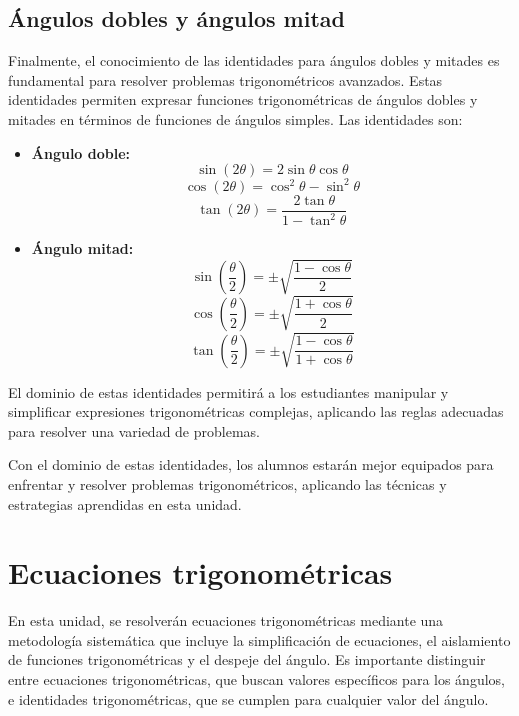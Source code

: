 \subsection{Ángulos dobles y ángulos mitad}

Finalmente, el conocimiento de las identidades para ángulos dobles y mitades es fundamental para resolver problemas trigonométricos avanzados. Estas identidades permiten expresar funciones trigonométricas de ángulos dobles y mitades en términos de funciones de ángulos simples. Las identidades son:

\begin{itemize}
    \item \textbf{Ángulo doble:}
    \[
    \sin (2\theta) = 2 \sin \theta \cos \theta
    \]
    \[
    \cos (2\theta) = \cos^2 \theta - \sin^2 \theta
    \]
    \[
    \tan (2\theta) = \frac{2 \tan \theta}{1 - \tan^2 \theta}
    \]

    \item \textbf{Ángulo mitad:}
    \[
    \sin \left(\frac{\theta}{2}\right) = \pm \sqrt{\frac{1 - \cos \theta}{2}}
    \]
    \[
    \cos \left(\frac{\theta}{2}\right) = \pm \sqrt{\frac{1 + \cos \theta}{2}}
    \]
    \[
    \tan \left(\frac{\theta}{2}\right) = \pm \sqrt{\frac{1 - \cos \theta}{1 + \cos \theta}}
    \]
\end{itemize}

El dominio de estas identidades permitirá a los estudiantes manipular y simplificar expresiones trigonométricas complejas, aplicando las reglas adecuadas para resolver una variedad de problemas.

Con el dominio de estas identidades, los alumnos estarán mejor equipados para enfrentar y resolver problemas trigonométricos, aplicando las técnicas y estrategias aprendidas en esta unidad.





\section{Ecuaciones trigonométricas} %

En esta unidad, se resolverán ecuaciones trigonométricas mediante una metodología sistemática que incluye la simplificación de ecuaciones, el aislamiento de funciones trigonométricas y el despeje del ángulo. Es importante distinguir entre ecuaciones trigonométricas, que buscan valores específicos para los ángulos, e identidades trigonométricas, que se cumplen para cualquier valor del ángulo.

